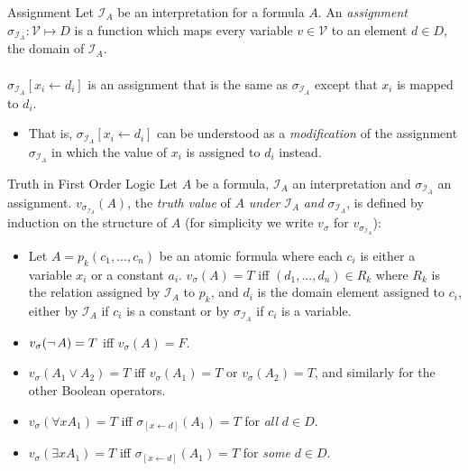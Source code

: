 \documentclass[style=sailor,size=12pt,mode=present]{powerdot}
\theoremstyle{definition}
\newenvironment{defn}[1]
  {\renewcommand\theinnerdefn{#1}\innerdefn}
  {\endinnerdefn}
\begin{document}
\begin{wideslide}[bm=,toc=]{Assignment}
\begin{defn}{7.18}[Ben Ari]
Let $\mathcal{I}_A$ be an interpretation for a formula $A$. An
\emph{assignment} $\sigma_{\mathcal{I}_A}: \mathcal{V} \mapsto D$
is a function which maps every variable $v \in \mathcal{V}$ to an
element $d \in D$, the domain of $\mathcal{I}_A$.\\~\\
$\sigma_{\mathcal{I}_A}[x_i \leftarrow d_i]$ is an assignment that is
the same as $\sigma_{\mathcal{I}_A}$ except that $x_i$ is mapped to
$d_i$.
\end{defn}
\begin{itemize}
\item That is, $\sigma_{\mathcal{I}_A}[x_i \leftarrow d_i]$ can be
understood as a \emph{modification} of the assignment 
$\sigma_{\mathcal{I}_A}$ in which the value of $x_i$ is assigned
to $d_i$ instead.
\end{itemize}
\end{wideslide}


\begin{wideslide}[bm=,toc=]{Truth in First Order Logic}
\begin{defn}{7.19}[Ben Ari]
Let $A$ be a formula, $\mathcal{I}_A$ an interpretation and
$\sigma_{\mathcal{I}_A}$ an assignment. $v_{\sigma_{\mathcal{I}_A}}(A)$,
the \emph{truth value} of $A$ \emph{under} $\mathcal{I}_A$ \emph{and}
$\sigma_{\mathcal{I}_A}$, is defined by induction on the structure of
$A$ (for simplicity we write $v_{\sigma}$ for $v_{\sigma_{\mathcal{I}_A}}$):
\end{defn}
\vspace{-2ex}
\begin{itemize}
\item Let $A = p_k(c_1,...,c_n)$ be an atomic formula where each $c_i$ is
either a variable $x_i$ or a constant $a_i$. $v_{\sigma}(A) = T$ iff $(d_1,...,d_n)
\in R_k$ where $R_k$ is the relation assigned by $\mathcal{I}_A$ to $p_k$, and
$d_i$ is the domain element assigned to $c_i$, either by $\mathcal{I}_A$ if
$c_i$ is a constant or by $\sigma_{\mathcal{I}_A}$ if $c_i$ is a variable.
\item $v_{\sigma}(\mathop{\neg} A) = T$ iff $v_{\sigma}(A) = F$.
\item $v_{\sigma}(A_1 \lor A_2) = T$ iff $v_{\sigma}(A_1) = T$ or
$v_{\sigma}(A_2) = T$, and similarly for the other Boolean operators.
\item $v_{\sigma}(\forall x A_1) = T$ iff $\sigma_{[x \leftarrow d]}(A_1) = T$
for \emph{all} $d \in D$.
\item $v_{\sigma}(\exists x A_1) = T$ iff $\sigma_{[x \leftarrow d]}(A_1) = T$
for \emph{some} $d \in D$.
\end{itemize}
\end{wideslide}
\end{document}
